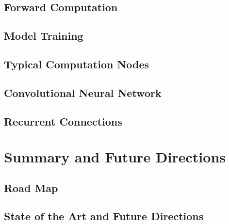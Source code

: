 \documentclass[a4paper]{article}
\begin{document}
\subsection{Forward Computation}

\subsection{Model Training}

\subsection{Typical Computation Nodes}

\subsection{Convolutional Neural Network}

\subsection{Recurrent Connections}


\newpage
\section{Summary and Future Directions}
\subsection{Road Map}

\subsection{State of the Art and Future Directions}


\end{document}
